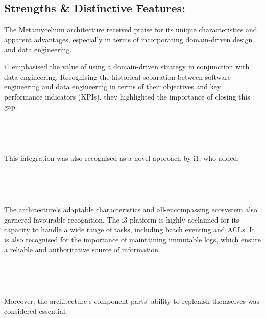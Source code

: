 \documentclass[journal]{IEEEtran}
\begin{document}
\subsection{Strengths \& Distinctive Features:}

The Metamycelium architecture received praise for its unique characteristics and apparent advantages, especially in terms of incorporating domain-driven design and data engineering.

i1 emphasised the value of using a domain-driven strategy in conjunction with data engineering. Recognising the historical separation between software engineering and data engineering in terms of their objectives and key performance indicators (KPIs), they highlighted the importance of closing this gap.


\,

\setlength{\fboxsep}{0.4em}
\noindent{}

\,


This integration was also recognised as a novel approach by i1, who added:

\,



\setlength{\fboxsep}{0.4em}
\noindent{}

\,


The architecture's adaptable characteristics and all-encompassing ecosystem also garnered favourable recognition. The i3 platform is highly acclaimed for its capacity to handle a wide range of tasks, including batch eventing and ACLs. It is also recognised for the importance of maintaining immutable logs, which ensure a reliable and authoritative source of information.

\,

\setlength{\fboxsep}{0.4em}
\noindent{}

\,


Moreover, the architecture's component parts' ability to replenish themselves was considered essential.
\end{document}
